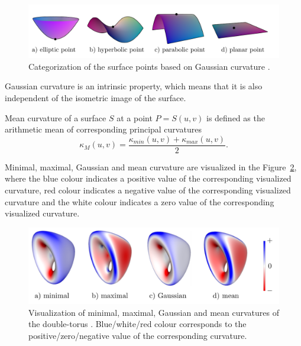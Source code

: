 \begin{figure}
    \centerline{\includegraphics[scale=0.5]{images/img33}}
    \caption[Categorization of the surface points based on Gaussian curvature]
    {Categorization of the surface points based on Gaussian curvature \cite{morris2003client}.}
    \label{img:33}
\end{figure}

Gaussian curvature is an
intrinsic property, which means that it is also independent of the isometric image of the surface.

\begin{definition}
    Mean curvature of a surface $S$ at a point $P=S(u,v)$ is defined as
    the arithmetic mean of corresponding principal curvatures
    $$\kappa_M(u, v) = \frac{\kappa_{min}(u,v) + \kappa_{max}(u,v)}{2}.$$
\end{definition}

Minimal, maximal, Gaussian and mean curvature are visualized in the Figure~\ref{img:16},
where the blue colour indicates a positive value of the corresponding visualized curvature,
red colour indicates a negative value of the corresponding visualized curvature
and the white colour indicates a zero value of the corresponding visualized curvature.

\begin{figure}
    \centerline{\includegraphics[scale=0.5]{images/img16}}
    \caption[Visualisation of the curvatures of the double-torus]
    {Visualization of minimal, maximal, Gaussian and mean curvatures of the double-torus \cite{novello2021differential}.
    Blue/white/red colour corresponds to the positive/zero/negative value of the corresponding curvature.}
    \label{img:16}
\end{figure}

